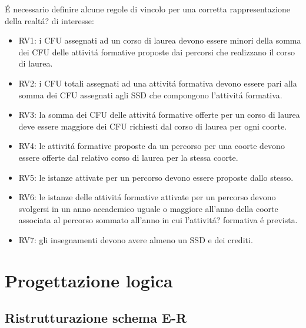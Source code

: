 \documentclass[a4paper,12pt,italian,towside]{article}
\begin{document}
\'E necessario definire alcune regole di vincolo per una corretta rappresentazione della realt\'a? di interesse:
\begin{itemize}
	\item RV1: i CFU assegnati ad un corso di laurea devono essere minori della somma dei CFU delle attivit\'a formative proposte dai percorsi che realizzano il corso di laurea.
	\item RV2: i CFU totali assegnati ad una attivit\'a formativa devono essere pari alla somma dei CFU assegnati agli SSD che compongono l'attivit\'a formativa.
	\item RV3: la somma dei CFU delle attivit\'a formative offerte per un corso di laurea deve essere maggiore dei CFU richiesti dal corso di laurea per ogni coorte.
	\item RV4: le attivit\'a formative proposte da un percorso per una coorte devono essere offerte dal relativo corso di laurea per la stessa coorte.
	\item RV5: le istanze attivate per un percorso devono essere proposte dallo stesso. 
	\item RV6: le istanze delle attivit\'a formative attivate per un percorso devono svolgersi in un anno accademico uguale o maggiore all'anno della coorte associata al percorso sommato all'anno in cui l'attivit\'a? formativa \'e prevista.
	\item RV7: gli insegnamenti devono avere almeno un SSD e dei crediti.
\end{itemize}

\newpage
\section{Progettazione logica}

\subsection{Ristrutturazione schema E-R}
\end{document}
